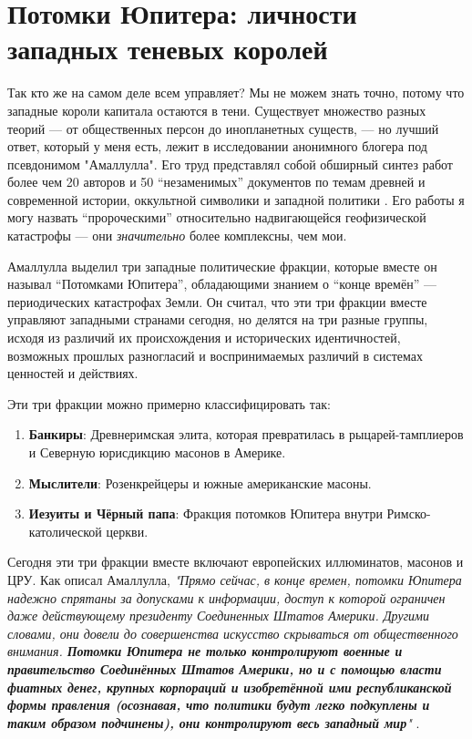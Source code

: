 \documentclass[10pt,twocolumn,letterpaper]{article}
\begin{document}
\section{Потомки Юпитера: личности западных теневых королей}

Так кто же на самом деле всем управляет? Мы не можем знать точно, потому что западные короли капитала остаются в тени. Существует множество разных теорий — от общественных персон до инопланетных существ, — но лучший ответ, который у меня есть, лежит в исследовании анонимного блогера под псевдонимом "Амаллулла". Его труд представлял собой обширный синтез работ более чем 20 авторов и 50 “незаменимых” документов по темам древней и современной истории, оккультной символики и западной политики \cite{33,34}. Его работы я могу назвать “пророческими” относительно надвигающейся геофизической катастрофы — они \textit{значительно} более комплексны, чем мои.

Амаллулла выделил три западные политические фракции, которые вместе он называл “Потомками Юпитера”, обладающими знанием о “конце времён” — периодических катастрофах Земли. Он считал, что эти три фракции вместе управляют западными странами сегодня, но делятся на три разные группы, исходя из различий их происхождения и исторических идентичностей, возможных прошлых разногласий и воспринимаемых различий в системах ценностей и действиях.

Эти три фракции можно примерно классифицировать так:

\begin{flushleft}
\begin{enumerate}
    \item \textbf{Банкиры}: Древнеримская элита, которая превратилась в рыцарей-тамплиеров и Северную юрисдикцию масонов в Америке.
    \item \textbf{Мыслители}: Розенкрейцеры и южные американские масоны.
    \item \textbf{Иезуиты и Чёрный папа}: Фракция потомков Юпитера внутри Римско-католической церкви.
\end{enumerate}
\end{flushleft}

Сегодня эти три фракции вместе включают европейских иллюминатов, масонов и ЦРУ. Как описал Амаллулла, \textit{"Прямо сейчас, в конце времен, потомки Юпитера надежно спрятаны за допусками к информации, доступ к которой ограничен даже действующему президенту Соединенных Штатов Америки. Другими словами, они довели до совершенства искусство скрываться от общественного внимания. \textbf{Потомки Юпитера не только контролируют военные и правительство Соединённых Штатов Америки, но и с помощью власти фиатных денег, крупных корпораций и изобретённой ими республиканской формы правления (осознавая, что политики будут легко подкуплены и таким образом подчинены), они контролируют весь западный мир}"} \cite{33,34}.
\end{document}
